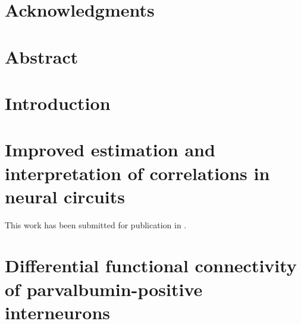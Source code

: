\documentclass[12pt,letterpaper,titlepage,twoside,openright]{report}
\begin{document}
\chapter*{Acknowledgments}


\chapter*{Abstract}


\tableofcontents

\listoffigures


\chapter{Introduction}
\clearpage 


\chapter{Improved estimation and interpretation of correlations in neural circuits}
This work has been submitted for publication in .
\clearpage









\chapter{Differential functional connectivity of parvalbumin-positive interneurons}
\clearpage







\end{document}
